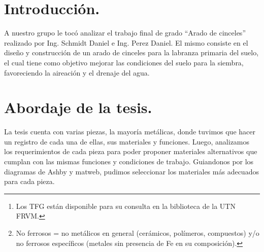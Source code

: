 \documentclass[15pt,a4paper]{article}
\begin{document}

\newpage
\tableofcontents

\begin{abstract}
    Analice, investigue e interprete el contenido del trabajo final de grado\footnote{Los TFG están disponible para su consulta en la biblioteca de la UTN FRVM.} asignado. [NOTA: Anualmente la Cátedra asignará los Casos de Estudio a cada equipo de trabajo]. Requerimientos:
    
    \begin{itemize}
        \item Usando la herramienta on line \url{https://matweb.com/}, \textbf{proponer materiales ferrosos y no ferrosos\footnote{No ferrosos = no metálicos en general (cerámicos, polímeros, compuestos) y/o no ferrosos específicos (metales sin presencia de Fe en su composición).} en reemplazo de} los materiales usados en el desarrollo del trabajo final de grado que cumplan con los mismos requerimientos.
        \item Verificar la selección de materiales realizada en el punto 1 mediante el empleo de diagramas de Ashby (software CESEDUPACK).
        \item Entrevistar al autor del trabajo final de grado, efectuar el registro videográfico y subir el video en YouTube. El enlace del video deberá registrarse en el informe.
    \end{itemize}
\end{abstract}

\newpage

\section{Introducción.}

A nuestro grupo le tocó analizar el trabajo final de grado \enquote{Arado de cinceles} realizado por Ing. Schmidt Daniel e Ing. Perez Daniel. El mismo consiste en el diseño y construcción de un arado de cinceles para la labranza primaria del suelo, el cual tiene como objetivo mejorar las condiciones del suelo para la siembra, favoreciendo la aireación y el drenaje del agua.

\section{Abordaje de la tesis.}

La tesis cuenta con varias piezas, la mayoría metálicas, donde tuvimos que hacer un registro de cada una de ellas, sus materiales y funciones. Luego, analizamos los requerimientos de cada pieza para poder proponer materiales alternativos que cumplan con las mismas funciones y condiciones de trabajo. Guiandonos por los diagramas de Ashby y matweb, pudimos seleccionar los materiales más adecuados para cada pieza.
\end{document}
